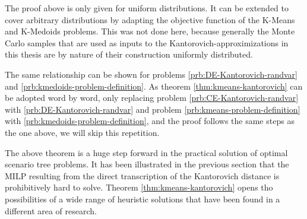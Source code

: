 \begin{Note}
  The proof above is only given for uniform distributions.
  It can be extended to cover arbitrary distributions by adapting the objective function of the K-Means and K-Medoids problems.
  This was not done here, because generally the Monte Carlo samples that are used as inputs to the Kantorovich-approximizations in this thesis are by nature of their construction uniformly distributed.
\end{Note}
The same relationship can be shown for problems \ref{prb:DE-Kantorovich-randvar} and \ref{prb:kmedoids-problem-definition}.
As theorem \ref{thm:kmeans-kantorovich} can be adopted word by word, only replacing problem \ref{prb:CE-Kantorovich-randvar} with \ref{prb:DE-Kantorovich-randvar} and problem \ref{prb:kmeans-problem-definition} with \ref{prb:kmedoids-problem-definition}, and the proof follows the same steps as the one above, we will skip this repetition.

The above theorem is a huge step forward in the practical solution of optimal scenario tree problems.
It has been illustrated in the previous section that the MILP resulting from the direct transcription of the Kantorovich distance is prohibitively hard to solve.
Theorem \ref{thm:kmeans-kantorovich} opens tho possibilities of a wide range of heuristic solutions that have been found in a different area of research.

